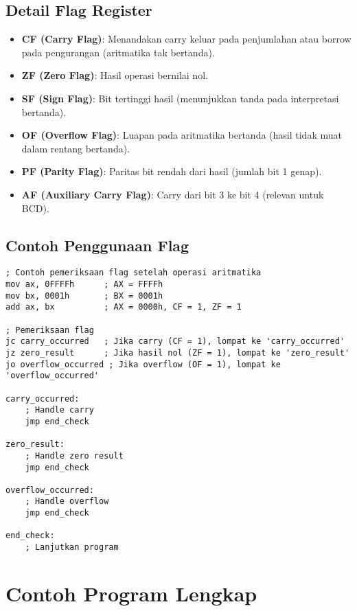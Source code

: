 \documentclass[../main.tex]{subfiles}
\begin{document}
        \subsection{Detail Flag Register}
            \begin{itemize}
\item \textbf{CF (Carry Flag)}: Menandakan carry keluar pada penjumlahan atau borrow pada pengurangan (aritmatika tak bertanda).
\item \textbf{ZF (Zero Flag)}: Hasil operasi bernilai nol.
\item \textbf{SF (Sign Flag)}: Bit tertinggi hasil (menunjukkan tanda pada interpretasi bertanda).
\item \textbf{OF (Overflow Flag)}: Luapan pada aritmatika bertanda (hasil tidak muat dalam rentang bertanda).
\item \textbf{PF (Parity Flag)}: Paritas bit rendah dari hasil (jumlah bit 1 genap).
\item \textbf{AF (Auxiliary Carry Flag)}: Carry dari bit 3 ke bit 4 (relevan untuk BCD).
            \end{itemize}

        \subsection{Contoh Penggunaan Flag}
            \begin{lstlisting}[language={[x86masm]Assembler}, caption=Penggunaan Flag untuk Conditional Jump, label={lst:flag-usage}]
; Contoh pemeriksaan flag setelah operasi aritmatika
mov ax, 0FFFFh      ; AX = FFFFh
mov bx, 0001h       ; BX = 0001h
add ax, bx          ; AX = 0000h, CF = 1, ZF = 1

; Pemeriksaan flag
jc carry_occurred   ; Jika carry (CF = 1), lompat ke 'carry_occurred'
jz zero_result      ; Jika hasil nol (ZF = 1), lompat ke 'zero_result'
jo overflow_occurred ; Jika overflow (OF = 1), lompat ke 'overflow_occurred'

carry_occurred:
    ; Handle carry
    jmp end_check

zero_result:
    ; Handle zero result
    jmp end_check

overflow_occurred:
    ; Handle overflow
    jmp end_check

end_check:
    ; Lanjutkan program
            \end{lstlisting}

    \section{Contoh Program Lengkap}
\end{document}
